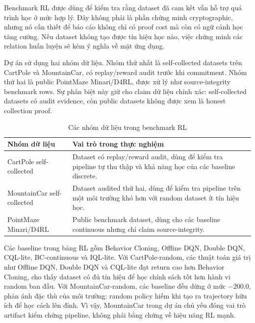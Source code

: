 \documentclass[12pt,a4paper,oneside]{report}
\begin{document}
Benchmark RL được dùng để kiểm tra rằng dataset đã cam kết vẫn hỗ trợ quá trình học ở mức hợp lý. Đây không phải là phần chứng minh cryptographic, nhưng nó cần thiết để báo cáo không chỉ có proof cost mà còn có ngữ cảnh học tăng cường. Nếu dataset không tạo được tín hiệu học nào, việc chứng minh các relation huấn luyện sẽ kém ý nghĩa về mặt ứng dụng.

Dự án sử dụng hai nhóm dữ liệu. Nhóm thứ nhất là self-collected datasets trên CartPole và MountainCar, có replay/reward audit trước khi commitment. Nhóm thứ hai là public PointMaze Minari/D4RL, được xử lý như source-integrity benchmark rows. Sự phân biệt này giữ cho claim dữ liệu chính xác: self-collected datasets có audit evidence, còn public datasets không được xem là honest collection proof.

\begin{table}[H]
\centering
\caption{Các nhóm dữ liệu trong benchmark RL}
\begin{tabularx}{\textwidth}{p{} p{}}
\toprule
Nhóm dữ liệu & Vai trò trong thực nghiệm \\
\midrule
CartPole self-collected & Dataset có replay/reward audit, dùng để kiểm tra pipeline tự thu thập và khả năng học của các baseline discrete. \\
MountainCar self-collected & Dataset audited thứ hai, dùng để kiểm tra pipeline trên một môi trường khó hơn với random dataset ít tín hiệu học. \\
PointMaze Minari/D4RL & Public benchmark dataset, dùng cho các baseline continuous nhưng chỉ claim source-integrity. \\
\bottomrule
\end{tabularx}
\end{table}

Các baseline trong bảng RL gồm Behavior Cloning, Offline DQN, Double DQN, CQL-lite, BC-continuous và IQL-lite. Với CartPole-random, các thuật toán giá trị như Offline DQN, Double DQN và CQL-lite đạt return cao hơn Behavior Cloning, cho thấy dataset có đủ tín hiệu để học chính sách tốt hơn hành vi random ban đầu. Với MountainCar-random, các baseline đều dừng ở mức \(-200.0\), phản ánh đặc thù của môi trường: random policy hiếm khi tạo ra trajectory hữu ích để học cách lên đỉnh. Vì vậy, MountainCar trong dự án chủ yếu đóng vai trò artifact kiểm chứng pipeline, không phải bằng chứng về hiệu năng RL mạnh.
\end{document}
